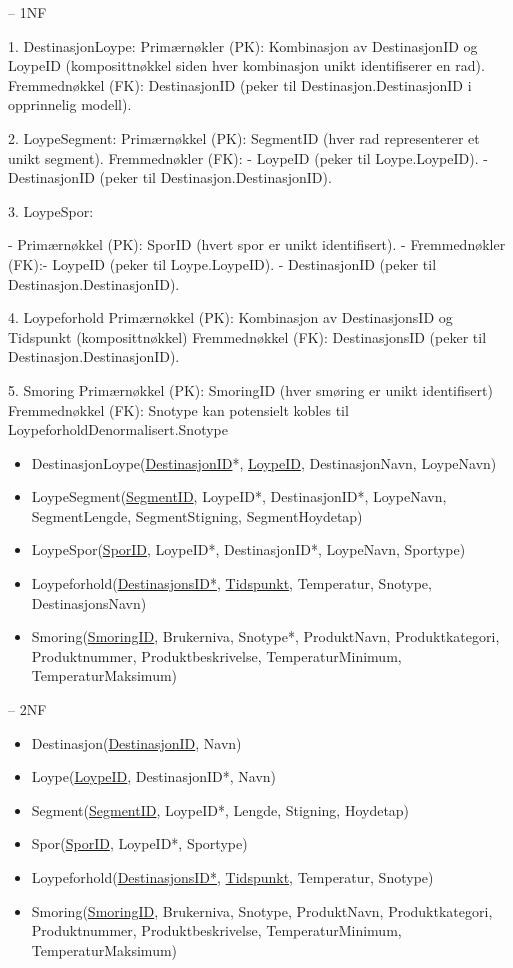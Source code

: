 \documentclass[10pt, a4paper]{article}
\begin{document}
-- 1NF

1. DestinasjonLoype:
Primærnøkler (PK): Kombinasjon av DestinasjonID og LoypeID (komposittnøkkel siden hver kombinasjon unikt identifiserer en rad).
Fremmednøkkel (FK): DestinasjonID (peker til Destinasjon.DestinasjonID i opprinnelig modell).

2. LoypeSegment:
Primærnøkkel (PK): SegmentID (hver rad representerer et unikt segment).
Fremmednøkler (FK):
- LoypeID (peker til Loype.LoypeID).
- DestinasjonID (peker til Destinasjon.DestinasjonID).

3. LoypeSpor:

- Primærnøkkel (PK): SporID (hvert spor er unikt identifisert).
- Fremmednøkler (FK):- LoypeID (peker til Loype.LoypeID).
- DestinasjonID (peker til Destinasjon.DestinasjonID).

4. Loypeforhold
Primærnøkkel (PK): Kombinasjon av DestinasjonsID og Tidspunkt (komposittnøkkel)
Fremmednøkkel (FK): DestinasjonsID (peker til Destinasjon.DestinasjonID).

5. Smoring
Primærnøkkel (PK): SmoringID (hver smøring er unikt identifisert)
Fremmednøkkel (FK): Snotype kan potensielt kobles til LoypeforholdDenormalisert.Snotype


\begin{itemize}
	\item DestinasjonLoype(\underline{DestinasjonID}*, \underline{LoypeID}, DestinasjonNavn, LoypeNavn) 
	\item LoypeSegment(\underline{SegmentID}, LoypeID*, DestinasjonID*, LoypeNavn, SegmentLengde, SegmentStigning, SegmentHoydetap) 
	\item LoypeSpor(\underline{SporID}, LoypeID*, DestinasjonID*, LoypeNavn, Sportype)
	\item Loypeforhold(\underline{DestinasjonsID*}, \underline{Tidspunkt}, Temperatur, Snotype, DestinasjonsNavn) 
	\item Smoring(\underline{SmoringID}, Brukerniva, Snotype*, ProduktNavn, Produktkategori, Produktnummer, Produktbeskrivelse, TemperaturMinimum, TemperaturMaksimum)
\end{itemize}

-- 2NF

\begin{itemize}
	\item Destinasjon(\underline{DestinasjonID}, Navn) 
	\item Loype(\underline{LoypeID}, DestinasjonID*, Navn) 
	\item Segment(\underline{SegmentID}, LoypeID*, Lengde, Stigning, Hoydetap) 
	\item Spor(\underline{SporID}, LoypeID*, Sportype)
	\item Loypeforhold(\underline{DestinasjonsID*}, \underline{Tidspunkt}, Temperatur, Snotype) 
	\item Smoring(\underline{SmoringID}, Brukerniva, Snotype, ProduktNavn, Produktkategori, Produktnummer, Produktbeskrivelse, TemperaturMinimum, TemperaturMaksimum)
\end{itemize}
\end{document}
